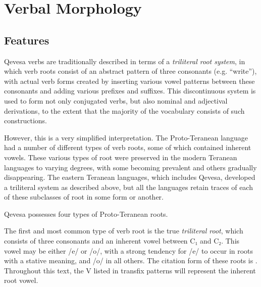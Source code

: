 \documentclass[grammar]{subfiles}
\begin{document}
\chapter{Verbal Morphology}
\label{ch:verbal_morphology}


\section{Features}
\label{sec:vm_features}

Qevesa verbs are traditionally described in terms of a \emph{triliteral
root system}, in which verb roots consist of an abstract pattern of three
consonants (e.g.  “write”), with actual verb forms created by
inserting various vowel patterns between these consonants and adding various
prefixes and suffixes.  This discontinuous system is used to form not only
conjugated verbs, but also nominal and adjectival derivations, to the extent
that the majority of the vocabulary consists of such constructions. 

However, this is a very simplified interpretation.  The Proto-Teranean language
had a number of different types of verb roots, some of which contained inherent
vowels.  These various types of root were preserved in the modern Teranean
languages to varying degrees, with some becoming prevalent and others gradually
disappearing.  The eastern Teranean languages, which includes Qevesa, developed
a triliteral system as described above, but all the languages retain traces of
each of these subclasses of root in some form or another. 

Qevesa possesses four types of Proto-Teranean roots. 


The first and most common type of verb root is the true \emph{triliteral root},
which consists of three consonants and an inherent vowel between C₁ and C₂.
This vowel may be either /e/ or /o/, with a strong tendency for /e/ to occur in
roots with a stative meaning, and /o/ in all others. The citation form of these
roots is .  Throughout this text, the V listed in transfix patterns
will represent the inherent root vowel.
\end{document}

